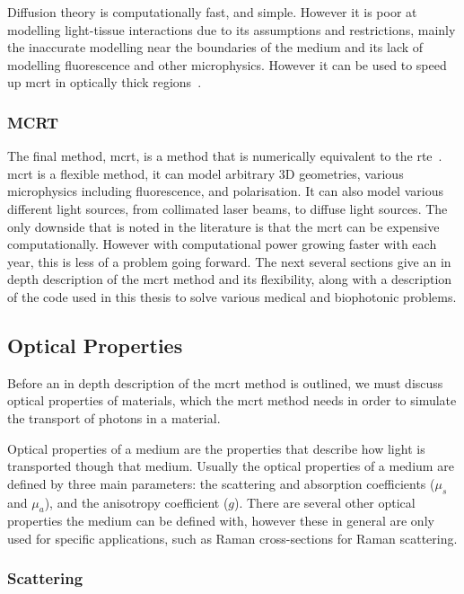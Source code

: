 Diffusion theory is computationally fast, and simple. However it is poor at modelling light-tissue interactions due to its assumptions and restrictions, mainly the inaccurate modelling near the boundaries of the medium and its lack of modelling fluorescence and other microphysics. However it can be used to speed up \gls*{mcrt} in optically thick regions~\cite{robitaille2010modified,min2009radiative}.

\subsubsection*{MCRT}
The final method, \gls*{mcrt}, is a method that is numerically equivalent to the \gls*{rte}~\cite{wang2012biomedical}. \gls*{mcrt} is a flexible method, it can model arbitrary 3D geometries, various microphysics including fluorescence, and polarisation. It can also model various different light sources, from collimated laser beams, to diffuse light sources. The only downside that is noted in the literature is that the \gls*{mcrt} can be expensive computationally. However with computational power growing faster with each year, this is less of a problem going forward. The next several sections give an in depth description of the \gls*{mcrt} method and its flexibility, along with a description of the code used in this thesis to solve various medical and biophotonic problems.

\subsection{Optical Properties}\label{sec:optprop}

Before an in depth description of the \gls*{mcrt} method is outlined, we must discuss optical properties of materials, which the \gls*{mcrt} method needs in order to simulate the transport of photons in a material.

Optical properties of a medium are the properties that describe how light is transported though that medium. Usually the optical properties of a medium are defined by three main parameters: the scattering and absorption coefficients ($\mu_s$ and $\mu_a$), and the anisotropy coefficient ($g$). There are several other optical properties the medium can be defined with, however these in general are only used for specific applications, such as Raman cross-sections for Raman scattering.

\subsubsection*{Scattering}\label{sec:scatt}

